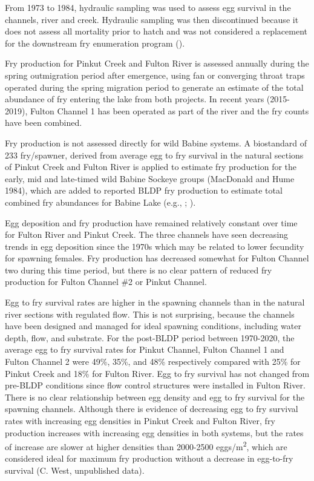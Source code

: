 \documentclass[french,11pt]{book}
\begin{document}
From 1973 to 1984, hydraulic sampling was used to assess egg survival in the channels, river and creek. Hydraulic sampling was then discontinued because it does not assess all mortality prior to hatch and was not considered a replacement for the downstream fry enumeration program ().

Fry production for Pinkut Creek and Fulton River is assessed annually during the spring outmigration period after emergence, using fan or converging throat traps operated during the spring migration period to generate an estimate of the total abundance of fry entering the lake from both projects. In recent years (2015-2019), Fulton Channel 1 has been operated as part of the river and the fry counts have been combined.

Fry production is not assessed directly for wild Babine systems. A biostandard of 233 fry/spawner, derived from average egg to fry survival in the natural sections of Pinkut Creek and Fulton River is applied to estimate fry production for the early, mid and late-timed wild Babine Sockeye groups (MacDonald and Hume 1984), which are added to reported BLDP fry production to estimate total combined fry abundances for Babine Lake (e.g., ; ).

Egg deposition and fry production have remained relatively constant over time for Fulton River and Pinkut Creek. The three channels have seen decreasing trends in egg deposition since the 1970s which may be related to lower fecundity for spawning females. Fry production has decreased somewhat for Fulton Channel two during this time period, but there is no clear pattern of reduced fry production for Fulton Channel \#2 or Pinkut Channel.

Egg to fry survival rates are higher in the spawning channels than in the natural river sections with regulated flow. This is not surprising, because the channels have been designed and managed for ideal spawning conditions, including water depth, flow, and substrate. For the post-BLDP period between 1970-2020, the average egg to fry survival rates for Pinkut Channel, Fulton Channel 1 and Fulton Channel 2 were 49\%, 35\%, and 48\% respectively compared with 25\% for Pinkut Creek and 18\% for Fulton River. Egg to fry survival has not changed from pre-BLDP conditions since flow control structures were installed in Fulton River. There is no clear relationship between egg density and egg to fry survival for the spawning channels. Although there is evidence of decreasing egg to fry survival rates with increasing egg densities in Pinkut Creek and Fulton River, fry production increases with increasing egg densities in both systems, but the rates of increase are slower at higher densities than 2000-2500 eggs/m\textsuperscript{2}, which are considered ideal for maximum fry production without a decrease in egg-to-fry survival (C. West, unpublished data).
\end{document}
